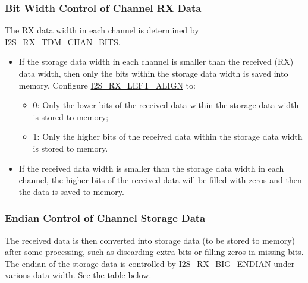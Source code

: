 \documentclass[main\_\_EN.tex]{subfiles}
\begin{document}
\subsubsection{Bit Width Control of Channel RX Data} 

The RX data width in each channel is determined by \hyperref[fielddesc:I2SRXTDMCHANBITS]{I2S\_RX\_TDM\_CHAN\_BITS}.
\begin{itemize}
\item If the storage data width in each channel is smaller than the received (RX) data width, then only the bits within the storage data width is saved into memory. Configure \hyperref[fielddesc:I2SRXLEFTALIGN]{I2S\_RX\_LEFT\_ALIGN} to:
\begin{itemize}
\item 0: Only the lower bits of the received data within the storage data width is stored to memory;
\item 1: Only the higher bits of the received data within the storage data width is stored to memory.
\end{itemize}
\item If the received data width is smaller than the storage data width in each channel, the higher bits of the received data will be filled with zeros and then the data is saved to memory.
\end{itemize}

\subsubsection{Endian Control of Channel Storage Data} 

The received data is then converted into storage data (to be stored to memory) after some processing, such as discarding extra bits or filling zeros in missing bits. The endian of the storage data is controlled by \hyperref[fielddesc:I2SRXBIGENDIAN]{I2S\_RX\_BIG\_ENDIAN} under various data width. See the table below.
\end{document}
